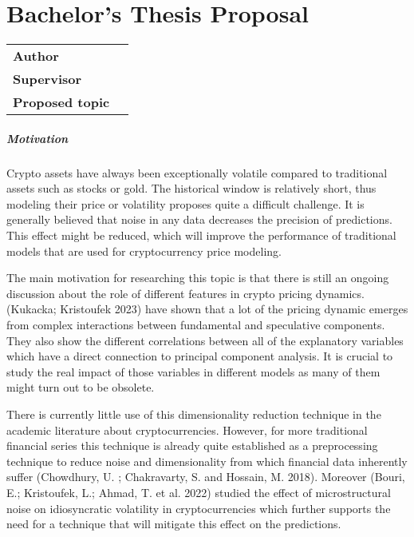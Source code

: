 \chapter*{Bachelor's Thesis Proposal}

\begin{tabular}{lp{10.1cm}}
	\hline
	\textbf{Author}         & \href{mailto:\Email}{\AutorDP}       \\
	\textbf{Supervisor}     & \href{mailto:\EmailSup}{\Supervisor} \\
	\textbf{Proposed topic} & \Bookname                            \\
	\hline
\end{tabular}

\bigskip

\small
\paragraph{Motivation}

Crypto assets have always been exceptionally volatile compared to traditional assets such as stocks or gold. The historical
window is relatively short, thus modeling their price or volatility proposes quite a difficult challenge. It is generally believed
that noise in any data decreases the precision of predictions. This effect might be reduced, which will improve the
performance of traditional models that are used for cryptocurrency price modeling.

The main motivation for researching this topic is that there is still an ongoing discussion about the role of different features
in crypto pricing dynamics. (Kukacka; Kristoufek 2023) have shown that a lot of the pricing dynamic emerges from complex
interactions between fundamental and speculative components. They also show the different correlations between all of the
explanatory variables which have a direct connection to principal component analysis. It is crucial to study the real impact of
those variables in different models as many of them might turn out to be obsolete.

There is currently little use of this dimensionality reduction technique in the academic literature about cryptocurrencies.
However, for more traditional financial series this technique is already quite established as a preprocessing technique to
reduce noise and dimensionality from which financial data inherently suffer (Chowdhury, U. ; Chakravarty, S. and Hossain,
M. 2018). Moreover (Bouri, E.; Kristoufek, L.; Ahmad, T. et al. 2022) studied the effect of microstructural noise on
idiosyncratic volatility in cryptocurrencies which further supports the need for a technique that will mitigate this effect on the
predictions.

